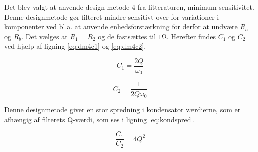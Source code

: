 Det blev valgt at anvende design metode 4 fra litteraturen, minimum sensitivitet.
Denne designmetode gør filteret mindre sensitivt over for variationer i komponenter ved bl.a.
at anvende enhedsforstærkning for derfor at undvære $R_a$ og $R_b$.
Det vælges at $R_1 = R_2$ og de fastsættes til $1\si{\ohm}$. Herefter findes $C_1$ og $C_2$ ved hjælp af ligning \ref{eq:dm4c1} og \ref{eq:dm4c2}.

\vspace{15pt}

\begin{minipage}{0.5\linewidth}
	\begin{equation}
	\label{eq:dm4c1}
	C_1 = \frac{2Q}{\omega_0}
	\end{equation}
\end{minipage}
\begin{minipage}{0.5\linewidth}
	\begin{equation}
	\label{eq:dm4c2}
	C_2 = \frac{1}{2Q\omega_0}
	\end{equation}
\end{minipage}

\vspace{15pt}

Denne designmetode giver en stor spredning i kondensator værdierne, som er afhængig af filterets Q-værdi, som ses i ligning
\ref{eq:kondspred}.

\begin{equation}
\label{eq:kondspred}
\frac{C_1}{C_2} = 4Q^2
\end{equation}

